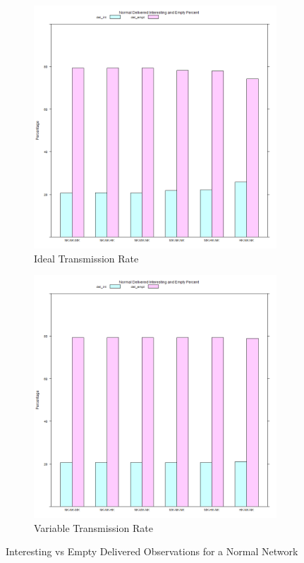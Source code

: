 \begin{figure}[H]
\centering
\begin{subfigure}{.5\textwidth}
  \centering
\includegraphics[width=\textwidth]{Chap7/figures/plots/normal_variable/emptvsint_percent.png}
  \caption{Ideal Transmission Rate}
	\label{fig:sim:res:norm:ideal:emptint}
\end{subfigure}%
\begin{subfigure}{.5\textwidth}
  \centering
\includegraphics[width=\textwidth]{Chap7/figures/plots/normal_ideal/emptvsint_percent.png}
  \caption{Variable Transmission Rate}
	\label{fig:sim:res:norm:variable:emptint}
\end{subfigure}
\caption{Interesting vs Empty Delivered Observations for a Normal Network}
\end{figure}

